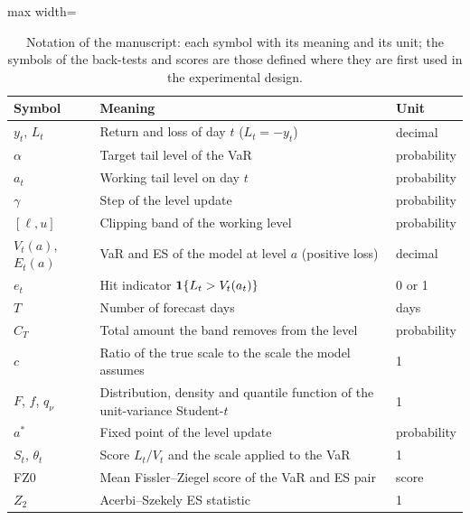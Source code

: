 \begin{table}[htbp]
\centering
\small
\caption{Notation of the manuscript: each symbol with its meaning and its unit; the symbols of the back-tests and scores are those defined where they are first used in the experimental design.}
\label{tab:notation}
{\footnotesize\setlength{\tabcolsep}{4pt}
\begin{adjustbox}{max width=\textwidth}
\begin{tabular}{lll}
\toprule
Symbol & Meaning & Unit \\
\midrule
$y_t$, $L_t$ & \relax Return and loss of day $t$ ($L_t = -y_t$) & decimal \\
$\alpha$ & Target tail level of the VaR & probability \\
$a_t$ & \relax Working tail level on day $t$ & probability \\
$\gamma$ & Step of the level update & probability \\
$[\ell, u]$ & Clipping band of the working level & probability \\
$V_t(a)$, $E_t(a)$ & \relax VaR and ES of the model at level $a$ (positive loss) & decimal \\
$e_t$ & \relax Hit indicator $\mathbf{1}\{L_t > V_t(a_t)\}$ & 0 or 1 \\
$T$ & Number of forecast days & days \\
$C_T$ & Total amount the band removes from the level & probability \\
$c$ & Ratio of the true scale to the scale the model assumes & 1 \\
$F$, $f$, $q_\nu$ & \relax Distribution, density and quantile function of the unit-variance Student-$t$ & 1 \\
$a^*$ & Fixed point of the level update & probability \\
$S_t$, $\theta_t$ & \relax Score $L_t/V_t$ and the scale applied to the VaR & 1 \\
FZ0 & Mean Fissler--Ziegel score of the VaR and ES pair & score \\
$Z_2$ & Acerbi--Szekely ES statistic & 1 \\
\bottomrule
\end{tabular}
\end{adjustbox}}
\end{table}
